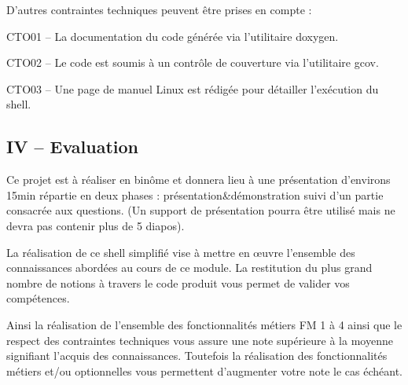 D’autres contraintes techniques peuvent être prises en compte \+:
\begin{DoxyItemize}
\item C\+T\+O01 – La documentation du code générée via l’utilitaire doxygen.
\item C\+T\+O02 – Le code est soumis à un contrôle de couverture via l’utilitaire gcov.
\item C\+T\+O03 – Une page de manuel Linux est rédigée pour détailler l’exécution du shell.
\end{DoxyItemize}

\subsection*{IV – Evaluation}

Ce projet est à réaliser en binôme et donnera lieu à une présentation d’environs 15min répartie en deux phases \+: présentation\&démonstration suivi d’un partie consacrée aux questions. (Un support de présentation pourra être utilisé mais ne devra pas contenir plus de 5 diapos).

La réalisation de ce shell simplifié vise à mettre en œuvre l’ensemble des connaissances abordées au cours de ce module. La restitution du plus grand nombre de notions à travers le code produit vous permet de valider vos compétences.

Ainsi la réalisation de l’ensemble des fonctionnalités métiers FM 1 à 4 ainsi que le respect des contraintes techniques vous assure une note supérieure à la moyenne signifiant l’acquis des connaissances. Toutefois la réalisation des fonctionnalités métiers et/ou optionnelles vous permettent d’augmenter votre note le cas échéant. 